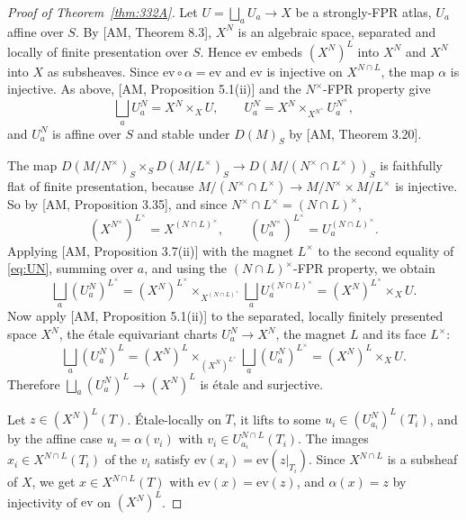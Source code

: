 \begin{proof}[Proof of Theorem~\ref{thm:332A}]
Let $U=\bigsqcup_a U_a\to X$ be a strongly-FPR atlas, $U_a$ affine over $S$. By [AM, Theorem 8.3], $X^{N}$ is an algebraic space, separated and locally of finite presentation over $S$. Hence $\mathrm{ev}$ embeds $(X^N)^L$ into $X^N$ and $X^N$ into $X$ as subsheaves. Since $\mathrm{ev}\circ\alpha=\mathrm{ev}$ and $\mathrm{ev}$ is injective on $X^{N\cap L}$, the map $\alpha$ is injective. As above, [AM, Proposition 5.1(ii)] and the $N^{\times}$-FPR property give
\begin{equation}\label{eq:UN}
\bigsqcup_a U_a^{N}=X^{N}\times_X U,\qquad U_a^{N}=X^{N}\times_{X^{N^{\times}}}U_a^{N^{\times}},
\end{equation}
and $U_a^{N}$ is affine over $S$ and stable under $D(M)_S$ by [AM, Theorem 3.20].

The map $D(M/N^{\times})_S\times_S D(M/L^{\times})_S\to D(M/(N^{\times}\cap L^{\times}))_S$ is faithfully flat of finite presentation, because $M/(N^{\times}\cap L^{\times})\to M/N^{\times}\times M/L^{\times}$ is injective. So by [AM, Proposition 3.35], and since $N^{\times}\cap L^{\times}=(N\cap L)^{\times}$,
\[
(X^{N^{\times}})^{L^{\times}}=X^{(N\cap L)^{\times}},\qquad (U_a^{N^{\times}})^{L^{\times}}=U_a^{(N\cap L)^{\times}}.
\]
Applying [AM, Proposition 3.7(ii)] with the magnet $L^{\times}$ to the second equality of \eqref{eq:UN}, summing over $a$, and using the $(N\cap L)^{\times}$-FPR property, we obtain
\[
\bigsqcup_a (U_a^{N})^{L^{\times}}=(X^{N})^{L^{\times}}\times_{X^{(N\cap L)^{\times}}}\bigsqcup_a U_a^{(N\cap L)^{\times}}=(X^{N})^{L^{\times}}\times_X U.
\]
Now apply [AM, Proposition 5.1(ii)] to the separated, locally finitely presented space $X^{N}$, the étale equivariant charts $U_a^{N}\to X^{N}$, the magnet $L$ and its face $L^{\times}$:
\[
\bigsqcup_a (U_a^{N})^{L}=(X^{N})^{L}\times_{(X^{N})^{L^{\times}}}\bigsqcup_a (U_a^{N})^{L^{\times}}=(X^{N})^{L}\times_X U.
\]
Therefore $\bigsqcup_a (U_a^{N})^{L}\to (X^{N})^{L}$ is étale and surjective.

Let $z\in (X^{N})^{L}(T)$. Étale-locally on $T$, it lifts to some $u_i\in (U_{a_i}^{N})^{L}(T_i)$, and by the affine case $u_i=\alpha(v_i)$ with $v_i\in U_{a_i}^{N\cap L}(T_i)$. The images $x_i\in X^{N\cap L}(T_i)$ of the $v_i$ satisfy $\mathrm{ev}(x_i)=\mathrm{ev}(z|_{T_i})$. Since $X^{N\cap L}$ is a subsheaf of $X$, we get $x\in X^{N\cap L}(T)$ with $\mathrm{ev}(x)=\mathrm{ev}(z)$, and $\alpha(x)=z$ by injectivity of $\mathrm{ev}$ on $(X^N)^L$.
\end{proof}

